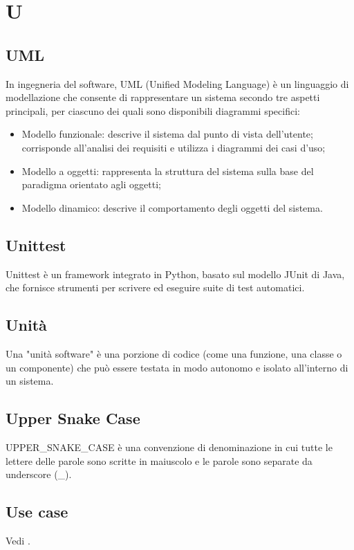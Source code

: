 \section{U}

\vspace{2em}
\subsection*{UML}
\par In ingegneria del software, UML (Unified Modeling Language) è un linguaggio di modellazione che consente di rappresentare un sistema secondo tre aspetti principali, per ciascuno dei quali sono disponibili diagrammi specifici:
\begin{itemize}
  \item Modello funzionale: descrive il sistema dal punto di vista dell'utente; corrisponde all'analisi dei requisiti e utilizza i diagrammi dei casi d'uso;
  \item Modello a oggetti: rappresenta la struttura del sistema sulla base del paradigma orientato agli oggetti;
  \item Modello dinamico: descrive il comportamento degli oggetti del sistema.
\end{itemize}

\vspace{2em}
\subsection*{Unittest}
\par Unittest è un framework integrato in Python, basato sul modello JUnit di Java, che fornisce strumenti per scrivere ed eseguire suite di test automatici.

\vspace{2em}
\subsection*{Unità}
\par Una "unità software" è una porzione di codice (come una funzione, una classe o un componente) che può essere testata in modo autonomo e isolato all'interno di un sistema.

\vspace{2em}
\subsection*{Upper Snake Case}
\par UPPER\_SNAKE\_CASE è una convenzione di denominazione in cui tutte le lettere delle parole sono scritte in maiuscolo e le parole sono separate da underscore (\_).

\vspace{2em}
\subsection*{Use case}
\par Vedi .
